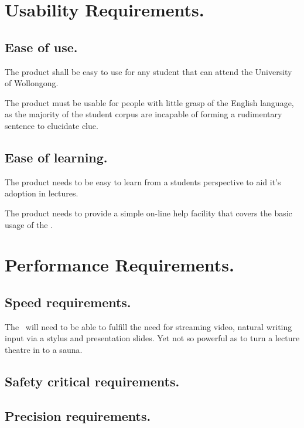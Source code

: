 \section{Usability Requirements.}

\subsection{Ease of use.}

The product shall be easy to use for any student that can attend the University of Wollongong.

The product must be usable for people with little grasp of the English language, as the majority of the student corpus are incapable of forming a rudimentary sentence to elucidate clue.

\subsection{Ease of learning.}

The product needs to be easy to learn from a students perspective to aid it's adoption in lectures.

The product needs to provide a simple on-line help facility that covers the basic usage of the \iDesk.

\section{Performance Requirements.}

\subsection{Speed requirements.}

The \iDesk\ will need to be able to fulfill the need for streaming video, natural writing input via a stylus and presentation slides. Yet not so powerful as to turn a lecture theatre in to a sauna.

\subsection{Safety critical requirements.}

\NA

\subsection{Precision requirements.}

\NA

